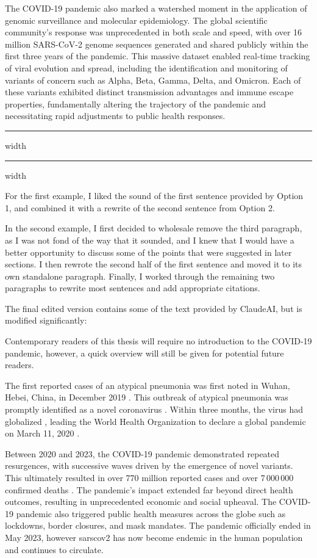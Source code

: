 The COVID-19 pandemic also marked a watershed moment in the application of genomic surveillance and molecular epidemiology. The global scientific community's response was unprecedented in both scale and speed, with over 16 million SARS-CoV-2 genome sequences generated and shared publicly within the first three years of the pandemic. This massive dataset enabled real-time tracking of viral evolution and spread, including the identification and monitoring of variants of concern such as Alpha, Beta, Gamma, Delta, and Omicron. Each of these variants exhibited distinct transmission advantages and immune escape properties, fundamentally altering the trajectory of the pandemic and necessitating rapid adjustments to public health responses.
\hrule width \hsize \kern 1mm \hrule width \hsize
\vspace{2em}

For the first example, I liked the sound of the first sentence provided by Option 1, and combined it with a rewrite of the second sentence from Option 2.

In the second example, I first decided to wholesale remove the third paragraph, as I was not fond of the way that it sounded, and I knew that I would have a better opportunity to discuss some of the points that were suggested in later sections.
I then rewrote the second half of the first sentence and moved it to its own standalone paragraph.
Finally, I worked through the remaining two paragraphs to rewrite most sentences and add appropriate citations.

The final edited version contains some of the text provided by ClaudeAI, but is modified significantly:

Contemporary readers of this thesis will require no introduction to the COVID-19 pandemic, however, a quick overview will still be given for potential future readers.

The first reported cases of an atypical pneumonia was first noted in Wuhan, Hebei, China, in December 2019 \citep{zhou2020pneumonia}.
This outbreak of atypical pneumonia was promptly identified as a novel coronavirus \citep{wu2020new}.
Within three months, the virus had globalized \cite{dong2020interactive}, leading the World Health Organization to declare a global pandemic on March 11, 2020 \cite{healthorganization2020coronavirus}.

Between 2020 and 2023, the COVID-19 pandemic demonstrated repeated resurgences, with successive waves driven by the emergence of novel variants.
This ultimately resulted in over 770 million reported cases and over 7\,000\,000 confirmed deaths \citep{ourworldindata-covid-explorer}.
The pandemic's impact extended far beyond direct health outcomes, resulting in unprecedented economic and social upheaval.
The COVID-19 pandemic also triggered public health measures across the globe such as  lockdowns, border closures, and mask mandates.
The pandemic officially ended in May 2023, however \gls{sarscov2} has now become endemic in the human population and continues to circulate.


\cleardoublepage

